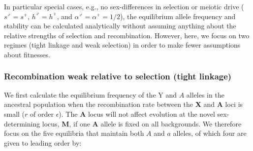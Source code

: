 \documentclass[12pt]{article}
\begin{document}
In particular special cases, e.g., no sex-differences in selection or meiotic drive ($s^\male=s^\female$, $h^\male=h^\female$, and $\alpha^\male=\alpha^\female=1/2$), the equilibrium allele frequency and stability can be calculated analytically without assuming anything about the relative strengths of selection and recombination. 
However, here, we focus on two regimes (tight linkage and weak selection) in order to make fewer assumptions about fitnesses. 

\subsubsection*{Recombination weak relative to selection (tight linkage)}

We first calculate the equilibrium frequency of the Y and $A$ alleles in the ancestral population when the recombination rate between the \textbf{X} and \textbf{A} loci is small ($r$ of order $\epsilon$). 
The \textbf{A} locus will not affect evolution at the novel sex-determining locus, \textbf{M}, if one \textbf{A} allele is fixed on all backgrounds. 
We therefore focus on the five equilibria that maintain both $A$ and $a$ alleles, of which four are given to leading order by:
\end{document}
